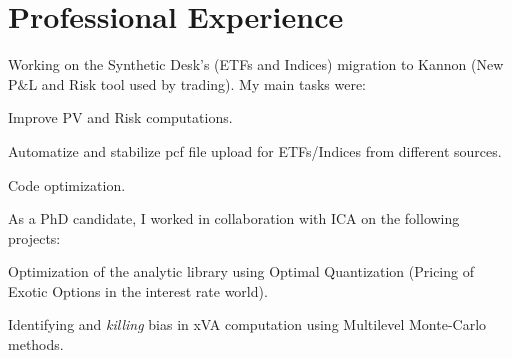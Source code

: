 \documentclass[]{deedy-resume-openfont}
\begin{document}
%
%
\lastupdated

%
%



\vspace{\topsep}

\section{Professional Experience}
\sectionsep

Working on the Synthetic Desk's (ETFs and Indices) migration to Kannon (New P$\&$L and Risk tool used by trading). My main tasks were:
\vspace{0.1cm}
\begin{tightemize}
	\item[\diamond] Improve PV and Risk computations.
	\item[\diamond] Automatize and stabilize pcf file upload for ETFs/Indices from different sources.
	\item[\diamond] Code optimization.
\end{tightemize}

\sectionsep
\sectionsep

As a PhD candidate, I worked in collaboration with ICA on the following projects:
\vspace{0.1cm}
\begin{tightemize}
	\item[\diamond] Optimization of the analytic library using Optimal Quantization (Pricing of Exotic Options in the interest rate world).
	\item[\diamond] Identifying and \textit{killing} bias in xVA computation using Multilevel Monte-Carlo methods.
\end{tightemize}
\end{document}
